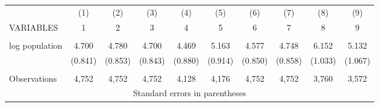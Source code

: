 \documentclass[]{article}
\begin{document}
\begin{tabular}{lccccccccc} \hline
 & (1) & (2) & (3) & (4) & (5) & (6) & (7) & (8) & (9) \\
VARIABLES & 1 & 2 & 3 & 4 & 5 & 6 & 7 & 8 & 9 \\ \hline
 &  &  &  &  &  &  &  &  &  \\
log population & 4.700 & 4.780 & 4.700 & 4.469 & 5.163 & 4.577 & 4.748 & 6.152 & 5.132 \\
 & (0.841) & (0.853) & (0.843) & (0.880) & (0.914) & (0.850) & (0.858) & (1.033) & (1.067) \\
 &  &  &  &  &  &  &  &  &  \\
 Observations & 4,752 & 4,752 & 4,752 & 4,128 & 4,176 & 4,752 & 4,752 & 3,760 & 3,572 \\ \hline
\multicolumn{10}{c}{ Standard errors in parentheses} \\
\end{tabular}
\end{document}
